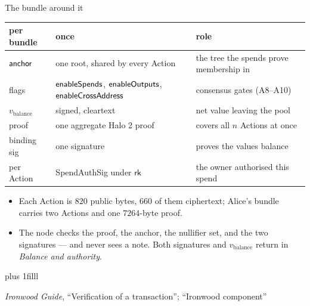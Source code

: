 \documentclass[aspectratio=169,11pt]{beamer}
\newcommand{\rksym}{\ensuremath{\mathsf{rk}}}
\newcommand{\src}[1]{\par\vskip0pt plus 1filll
  {\fontsize{6}{7.2}\selectfont\color{arbdim}\raggedright #1\par}}
\begin{document}
\begin{frame}{The bundle around it}
\begin{center}\small
\begin{tabular}{@{}lp{5.4cm}p{6.2cm}@{}}
\toprule
per bundle & once & role \\
\midrule
$\mathsf{anchor}$ & one root, shared by every Action & the tree the spends
  prove membership in \\
flags & $\mathsf{enableSpends}$, $\mathsf{enableOutputs}$,\newline
  $\mathsf{enableCrossAddress}$ & consensus gates (A8--A10) \\
$v_{\mathrm{balance}}$ & signed, cleartext & net value leaving the
  pool \\
proof & one aggregate Halo 2 proof & covers all $n$ Actions at once \\
binding sig & one signature & proves the values balance \\
\addlinespace
per Action & SpendAuthSig under $\rksym$ & the owner authorised this
  spend \\
\bottomrule
\end{tabular}
\end{center}
\medskip
\small
\begin{itemize}
  \item Each Action is $820$ public bytes, $660$ of them ciphertext;
    Alice's bundle carries two Actions and one $7264$-byte proof.
  \item The node checks the proof, the anchor, the nullifier set, and
    the two signatures --- and never sees a note. Both signatures and
    $v_{\mathrm{balance}}$ return in \emph{Balance and authority}.
\end{itemize}
\src{\emph{Ironwood Guide}, ``Verification of a transaction''; ``Ironwood
  component''}
\end{frame}
\end{document}
